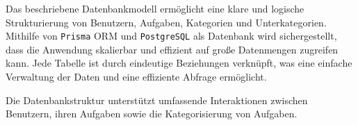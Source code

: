 Das beschriebene Datenbankmodell ermöglicht eine klare und logische Strukturierung von Benutzern, Aufgaben, Kategorien und Unterkategorien. Mithilfe von \texttt{Prisma} ORM und \texttt{PostgreSQL} als Datenbank wird sichergestellt, dass die Anwendung skalierbar und effizient auf große Datenmengen zugreifen kann. Jede Tabelle ist durch eindeutige Beziehungen verknüpft, was eine einfache Verwaltung der Daten und eine effiziente Abfrage ermöglicht.


Die Datenbankstruktur unterstützt umfassende Interaktionen zwischen Benutzern, ihren Aufgaben sowie die Kategorisierung von Aufgaben.

